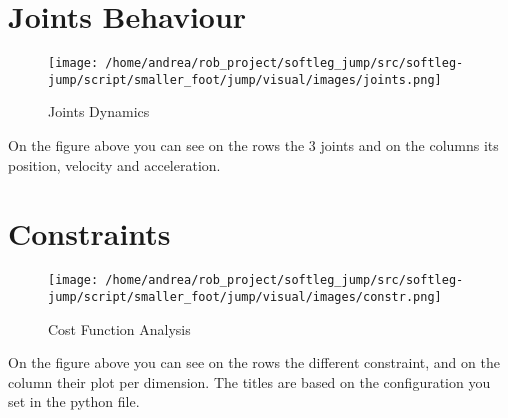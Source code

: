 \documentclass{article}%
\begin{document}
%
\section{Joints Behaviour}%
\label{sec:JointsBehaviour}%


\begin{figure}[h!]%
\centering%
\texttt{[image: /home/andrea/rob\_project/softleg\_jump/src/softleg-jump/script/smaller\_foot/jump/visual/images/joints.png]}%
\caption{Joints Dynamics}%
\end{figure}

%
On the figure above you can see on the rows the 3 joints and on the columns its position, velocity and acceleration.

%
\pagebreak%
\section{Constraints}%
\label{sec:Constraints}%


\begin{figure}[h!]%
\centering%
\texttt{[image: /home/andrea/rob\_project/softleg\_jump/src/softleg-jump/script/smaller\_foot/jump/visual/images/constr.png]}%
\caption{Cost Function Analysis}%
\end{figure}

%
On the figure above you can see on the rows the different constraint, and on the column their plot per dimension. The titles are based on the configuration you set in the python file.

%
\end{document}
